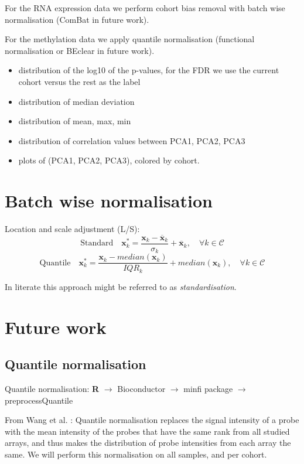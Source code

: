 \documentclass[a4paper,10pt]{article}
\begin{document}
For the RNA expression data we perform cohort bias removal with batch wise normalisation (ComBat in future work).

For the methylation data we apply quantile normalisation (functional normalisation or BEclear in future work).



\begin{itemize}
\item distribution of the log10 of the p-values, for the FDR we use the current cohort versus the rest as the label
\item distribution of median deviation
\item distribution of mean, max, min 
\item distribution of correlation values between PCA1, PCA2, PCA3
\item plots of (PCA1, PCA2, PCA3), colored by cohort.
\end{itemize}
%

\section{Batch wise normalisation}
%
Location and scale adjustment (L/S):
\begin{equation}
\mbox{Standard}\quad \mathbf{x}^*_k= \frac{\mathbf{x}_k-\overline{\mathbf{x}}_k}{\sigma_k} + \overline{\mathbf{x}}_k,\quad \forall k\in \mathcal{C}
\end{equation}
\begin{equation}
\mbox{Quantile}\quad \mathbf{x}^*_k= \frac{\mathbf{x}_k-median{(\mathbf{x}_k)}}{IQR_k} + median{(\mathbf{x}_k)},\quad \forall k\in \mathcal{C}
\end{equation}
%

In literate this approach might be referred to as \textit{standardisation}.

\section{Future work}
\subsection{Quantile normalisation}
%
Quantile normalisation: \textbf{R} $\rightarrow$ Bioconductor $\rightarrow$ minfi package $\rightarrow$ preprocessQuantile

From Wang et al. \cite{Wang2015}: Quantile normalisation replaces the signal intensity of a probe with the mean intensity of the probes that have the same rank from all studied arrays, and thus makes the distribution of probe intensities from each array the same. We will perform this normalisation 
on all samples, and per cohort.
\end{document}

